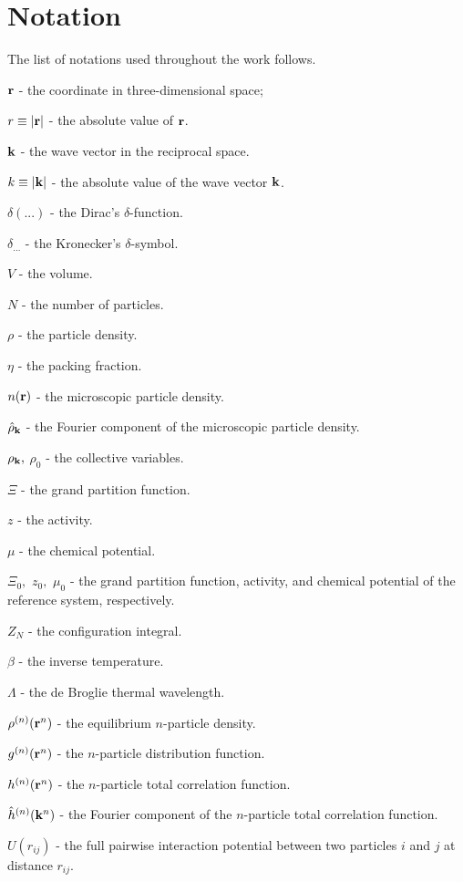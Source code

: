 \section{Notation}

The list of notations used throughout the work follows.

$\vb r$ - the coordinate in three-dimensional space;

$r \equiv \abs{\vb r}$ - the absolute value of $\vb r$.

$\vb k$ - the wave vector in the reciprocal space.

$k \equiv \abs{\vb k}$ - the absolute value of the wave vector $\vb k$.

$\delta(...)$ - the Dirac's $\delta$-function.

$\delta_{...}$ - the Kronecker's $\delta$-symbol.

$V$ - the volume.

$N$ - the number of particles.

$\rho$ - the particle density.

$\eta$ - the packing fraction.

$n(\vb r)$ - the microscopic particle density.

$\hat{\rho}_{\vb k}$ - the Fourier component of the microscopic particle density.

$\rho_{\vb k},$ $\rho_0$ - the collective variables.

$\Xi$ - the grand partition function.

$z$ - the activity.

$\mu$ - the chemical potential.

$\Xi_0,$ $z_0,$ $\mu_0$ - the grand partition function, activity, and chemical potential of the reference system, respectively.

$Z_N$ - the configuration integral.

$\beta$ - the inverse temperature.

$\Lambda$ - the de Broglie thermal wavelength.

$\rho^{(n)}(\vb r^n)$ - the equilibrium $n$-particle density.

$g^{(n)}(\vb r^n)$ - the $n$-particle distribution function.

$h^{(n)}(\vb r^n)$ - the $n$-particle total correlation function.

$\hat{h}^{(n)}(\vb k^n)$ - the Fourier component of the $n$-particle total correlation function.

$U(r_{ij})$ - the full pairwise interaction potential between two particles $i$ and $j$ at distance $r_{ij}$.

